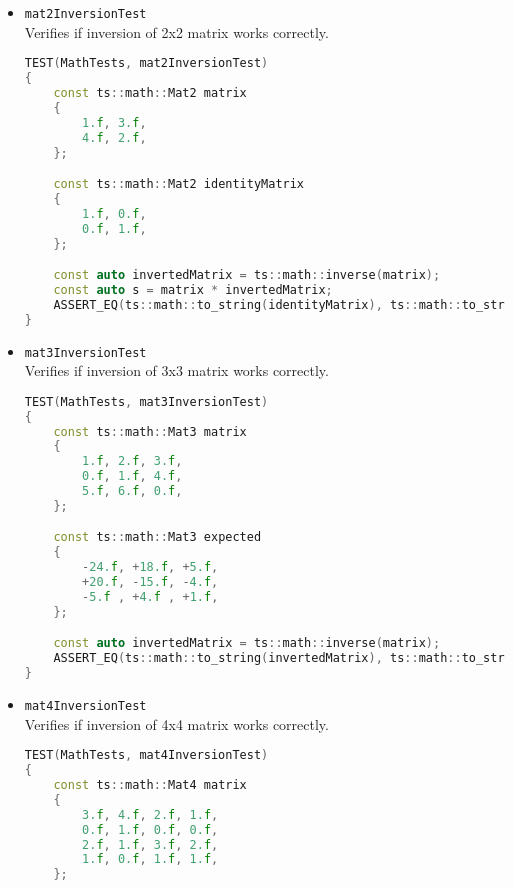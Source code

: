 \begin{itemize}
\begin{itemize}
\begin{lstlisting}[language=c++, caption=mat3MultiplicationTest test(./engine/tests/tester.cpp)]
    const ts::math::Mat3 rightMatrix
    {
        0.11f, 0.12f, 0.13f,
        0.14f, 0.15f, 0.16f,
        0.17f, 0.18f, 0.19f,
    };

    const ts::math::Mat3 expected
    {
        0.216f, 0.231f, 0.246f,
        0.342f, 0.366f, 0.39f ,
        0.09f , 0.096f, 0.102f,
    };

    const auto multiplication = rightMatrix * leftMatrix;
    ASSERT_EQ(ts::math::to_string(expected), ts::math::to_string(multiplication));
}
\end{lstlisting}
            \item \texttt{mat2InversionTest}\\ Verifies if inversion of 2x2 matrix works correctly.
\begin{lstlisting}[language=c++, caption=mat2InversionTest test(./engine/tests/tester.cpp)]
TEST(MathTests, mat2InversionTest)
{
    const ts::math::Mat2 matrix
    {
        1.f, 3.f,
        4.f, 2.f,
    };

    const ts::math::Mat2 identityMatrix
    {
        1.f, 0.f,
        0.f, 1.f,
    };

    const auto invertedMatrix = ts::math::inverse(matrix);
    const auto s = matrix * invertedMatrix;
    ASSERT_EQ(ts::math::to_string(identityMatrix), ts::math::to_string(s));
}
\end{lstlisting}
            \item \texttt{mat3InversionTest}\\ Verifies if inversion of 3x3 matrix works correctly.
\begin{lstlisting}[language=c++, caption=mat3InversionTest test(./engine/tests/tester.cpp)]
TEST(MathTests, mat3InversionTest)
{
    const ts::math::Mat3 matrix
    {
        1.f, 2.f, 3.f,
        0.f, 1.f, 4.f,
        5.f, 6.f, 0.f,
    };

    const ts::math::Mat3 expected
    {
        -24.f, +18.f, +5.f,
        +20.f, -15.f, -4.f,
        -5.f , +4.f , +1.f,
    };

    const auto invertedMatrix = ts::math::inverse(matrix);
    ASSERT_EQ(ts::math::to_string(invertedMatrix), ts::math::to_string(expected));
}
\end{lstlisting}
            \item \texttt{mat4InversionTest}\\ Verifies if inversion of 4x4 matrix works correctly.
\begin{lstlisting}[language=c++, caption=mat4InversionTest test(./engine/tests/tester.cpp)]
TEST(MathTests, mat4InversionTest)
{
    const ts::math::Mat4 matrix
    {
        3.f, 4.f, 2.f, 1.f,
        0.f, 1.f, 0.f, 0.f,
        2.f, 1.f, 3.f, 2.f,
        1.f, 0.f, 1.f, 1.f,
    };


\end{lstlisting}
\end{itemize}
\end{itemize}
